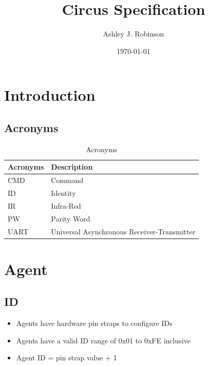 \documentclass[a4paper]{article}
\title{Circus Specification}
\author{Ashley J. Robinson}
\date{\today}
\begin{document}
\maketitle

\section{Introduction}

   \subsection{Acronyms} 
      \begin{table}[h]
         \centering
         \caption{Acronyms}
         \label{tab_acronyms}
         \begin{tabular}{|l|l|}
            \hline
            \textbf{Acronyms}    &  \textbf{Description}                         \\ \hline  
            CMD                  &  Command                                      \\ \hline
            ID                   &  Identity                                     \\ \hline
            IR                   &  Infra-Red                                    \\ \hline
            PW                   &  Parity Word                                  \\ \hline
            UART                 &  Universal Asynchronous Receiver-Transmitter  \\ \hline  
         \end{tabular}
\end{table}  


\section{Agent}

   \subsection{ID}
      \begin{itemize}
         \item Agents have hardware pin straps to configure IDs
         \item Agents have a valid ID range of 0x01 to 0xFE inclusive
         \item Agent ID = pin strap value + 1
      \end{itemize}
  
\end{document}
